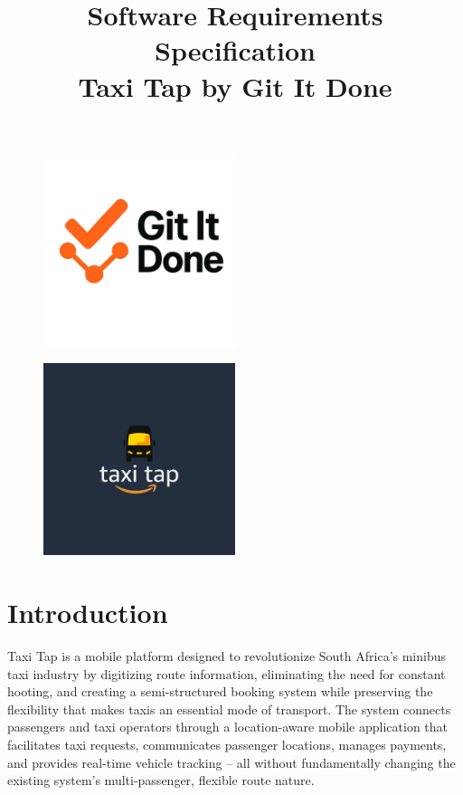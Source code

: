 \documentclass[a4paper,12pt]{article}
\title{Software Requirements Specification\\Taxi Tap by Git It Done}
\date{}
\begin{document}
\maketitle

\begin{figure}[h]
  \centering
  \includegraphics[width=0.5\textwidth]{LogoGroup.png} 
\end{figure}

\begin{figure}[h]
  \centering
  \includegraphics[width=0.5\textwidth]{LogoTaxiTap.png} 
\end{figure}

\tableofcontents
\newpage

\section{Introduction}
Taxi Tap is a mobile platform designed to revolutionize South Africa’s minibus taxi industry by digitizing route information, eliminating the need for constant hooting, and creating a semi-structured booking system while preserving the flexibility that makes taxis an essential mode of transport. The system connects passengers and taxi operators through a location-aware mobile application that facilitates taxi requests, communicates passenger locations, manages payments, and provides real-time vehicle tracking – all without fundamentally changing the existing system's multi-passenger, flexible route nature.
\end{document}
